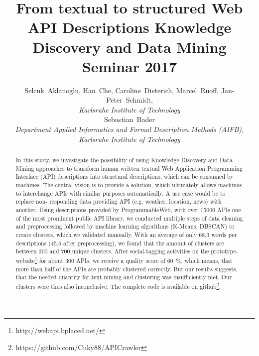 \documentclass[a4paper]{IEEEtran}
\begin{document}
\title{ From textual to structured Web API Descriptions {\large Knowledge Discovery and Data Mining Seminar 2017}}

\author{Selcuk~Aklanoglu,
        Han~Che,
        Caroline~Dieterich,
        Marcel~Ruoff,
        Jan-Peter~Schmidt,  \\
\textit{Karlsruhe Institute of Technology}  \\
Sebastian~Bader \\
\textit{Department Applied Informatics and  Formal Description Methods (AIFB),  \\
Karlsruhe Institute of Technology}

}



\maketitle

\begin{abstract}
In this study, we investigate the possibility of using Knowledge Discovery and Data Mining approaches to transform human written textual Web Application Programming Interface
(API) descriptions into structural descriptions, which
can be consumed by machines. The central vision
is to provide a solution, which ultimately allows
machines to interchange APIs with similar purposes
automatically. A use case would be to replace non-
responding data providing API (e.g. weather,
location, news) with another. Using descriptions
provided by ProgrammableWeb, with over 15000
APIs one of the most prominent public API library,
we conducted multiple steps of data cleaning and
preprocessing followed by machine learning
algorithms (K-Means, DBSCAN) to create clusters,
which we validated manually. With an average of only
68,3 words per descriptions (45,6 after
preprocessing), we found that the amount of clusters are between 300 and 700 unique clusters. After social-tagging activities on the prototype-website\footnote{http://webapi.bplaced.net/} for about 300 APIs, we receive a quality score of 60~\%, which means, that more than half of the APIs are probably clustered correctly. But our results suggests, that the
needed quantity for text mining and clustering was insufficiently met. Our clusters were thus also inconclusive. 
The complete code is available on github\footnote{https://github.com/Cuky88/APICrawler}.
\end{abstract}


\IEEEpeerreviewmaketitle
\end{document}
